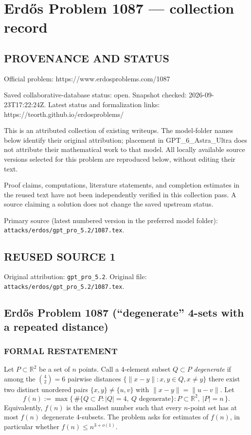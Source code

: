 \section*{Erd\H{o}s Problem 1087 --- collection record}

\subsection*{PROVENANCE AND STATUS}
Official problem: https://www.erdosproblems.com/1087

Saved collaborative-database status: open.
Snapshot checked: 2026-09-23T17:22:24Z.
Latest status and formalization links: https://teorth.github.io/erdosproblems/

This is an attributed collection of existing writeups. The model-folder names below identify their original attribution; placement in GPT\_6\_Astra\_Ultra does not attribute their mathematical work to that model. All locally available source versions selected for this problem are reproduced below, without editing their text.

Proof claims, computations, literature statements, and completion estimates in the reused text have not been independently verified in this collection pass. A source claiming a solution does not change the saved upstream status.

Primary source (latest numbered version in the preferred model folder): \texttt{attacks/erdos/gpt\_pro\_5.2/1087.tex}.

\subsection*{REUSED SOURCE 1}
Original attribution: \texttt{gpt\_pro\_5.2}.
Original file: \texttt{attacks/erdos/gpt\_pro\_5.2/1087.tex}.


\subsection*{Erd\H{o}s Problem 1087 (``degenerate'' 4-sets with a repeated distance)}

\subsubsection*{FORMAL RESTATEMENT}
Let \(P\subset\mathbb{R}^2\) be a set of \(n\) points.
Call a 4-element subset \(Q\subset P\) \emph{degenerate} if among the \(\binom{4}{2}=6\) pairwise distances \(\{\|x-y\|: x,y\in Q, x\ne y\}\) there exist two distinct unordered pairs \(\{x,y\}\ne\{u,v\}\) with \(\|x-y\|=\|u-v\|\).
Let
\[
 f(n):=\max\{\,\#\{Q\subset P: |Q|=4,\ Q\text{ degenerate}\}: P\subset\mathbb{R}^2,\ |P|=n\,\}.
\]
Equivalently, \(f(n)\) is the smallest number such that every \(n\)-point set has at most \(f(n)\) degenerate 4-subsets.
The problem asks for estimates of \(f(n)\), in particular whether \(f(n)\le n^{3+o(1)}\).

